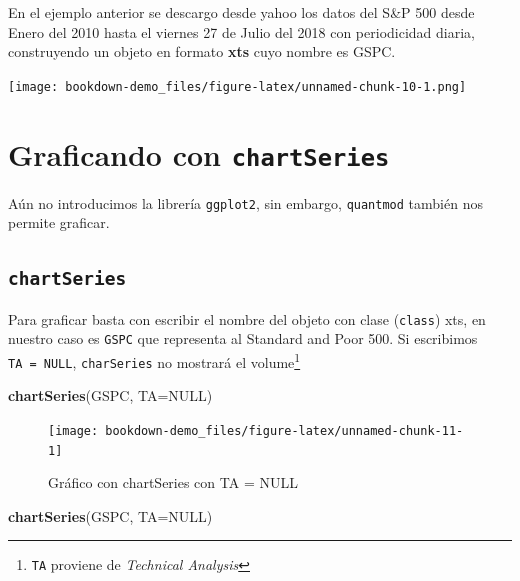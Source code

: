 \documentclass[12pt,]{book}
\newenvironment{Shaded}{\begin{snugshade}}{\end{snugshade}}
\newcommand{\KeywordTok}[1]{\textcolor[rgb]{0.13,0.29,0.53}{\textbf{#1}}}
\newcommand{\DataTypeTok}[1]{\textcolor[rgb]{0.13,0.29,0.53}{#1}}
\newcommand{\OtherTok}[1]{\textcolor[rgb]{0.56,0.35,0.01}{#1}}
\newcommand{\NormalTok}[1]{#1}
\begin{document}
En el ejemplo anterior se descargo desde yahoo los datos del S\&P 500
desde Enero del 2010 hasta el viernes 27 de Julio del 2018 con
periodicidad diaria, construyendo un objeto en formato \textbf{xts} cuyo
nombre es GSPC.

\texttt{[image: bookdown-demo\_files/figure-latex/unnamed-chunk-10-1.png]}

\section{\texorpdfstring{Graficando con
\texttt{chartSeries}}{Graficando con chartSeries}}\label{graficando-con-chartseries}

Aún no introducimos la librería \texttt{ggplot2}, sin embargo,
\texttt{quantmod} también nos permite graficar.

\subsection{\texorpdfstring{\texttt{chartSeries}}{chartSeries}}\label{chartseries}

Para graficar basta con escribir el nombre del objeto con clase
(\texttt{class}) xts, en nuestro caso es \texttt{GSPC} que representa al
Standard and Poor 500. Si escribimos \texttt{TA\ =\ NULL},
\texttt{charSeries} no mostrará el volume\footnote{\texttt{TA} proviene
  de \emph{Technical Analysis}}

\begin{Shaded}
\begin{Highlighting}[]
\KeywordTok{chartSeries}\NormalTok{(GSPC, }\DataTypeTok{TA=}\OtherTok{NULL}\NormalTok{)}
\end{Highlighting}
\end{Shaded}

\begin{figure}

{\centering \texttt{[image: bookdown-demo\_files/figure-latex/unnamed-chunk-11-1]} 

}

\caption{Gráfico con chartSeries con TA = NULL}\label{fig:unnamed-chunk-11}
\end{figure}

\begin{Shaded}
\begin{Highlighting}[]
\KeywordTok{chartSeries}\NormalTok{(GSPC, }\DataTypeTok{TA=}\OtherTok{NULL}\NormalTok{)}
\end{Highlighting}
\end{Shaded}
\end{document}
